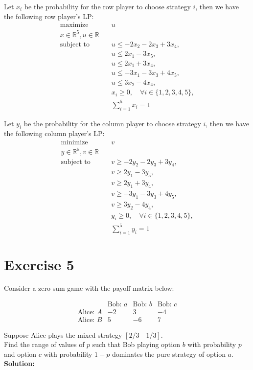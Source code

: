 \documentclass{article}
\begin{document}
Let $x_i$ be the probability for the row player to choose strategy $i$, then we have the following row player's LP:
\begin{align*}
\text{maximize} & \quad u \\
x \in \mathbb{R}^5, u \in \mathbb{R} & \\
\text{subject to} & \quad u \leq -2x_2 - 2x_3 + 3x_4, \\
& \quad u \leq 2x_1 - 3x_5, \\
& \quad u \leq 2x_1 + 3x_4, \\
& \quad u \leq -3x_1 - 3x_3 + 4x_5, \\
& \quad u \leq 3x_2 - 4x_4, \\
& \quad x_i \geq 0, \quad \forall i \in \{1,2,3,4,5\}, \\
& \quad \sum_{i=1}^5 x_i = 1
\end{align*}

Let $y_i$ be the probability for the column player to choose strategy $i$, then we have the following column player's LP:
\begin{align*}
\text{minimize} & \quad v \\
y \in \mathbb{R}^5, v \in \mathbb{R} & \\
\text{subject to} & \quad v \geq -2y_2 - 2y_3 + 3y_4, \\
& \quad v \geq 2y_1 - 3y_5, \\
& \quad v \geq 2y_1 + 3y_4, \\
& \quad v \geq -3y_1 - 3y_3 + 4y_5, \\
& \quad v \geq 3y_2 - 4y_4, \\
& \quad y_i \geq 0, \quad \forall i \in \{1,2,3,4,5\}, \\
& \quad \sum_{i=1}^5 y_i = 1
\end{align*}

\newpage

\section*{Exercise 5}
Consider a zero-sum game with the payoff matrix below:

$$\begin{array}{c|ccc}
& \text{Bob: } a & \text{Bob: } b & \text{Bob: } c \\
\hline
\text{Alice: } A & -2 & 3 & -4 \\
\text{Alice: } B & 5 & -6 & 7
\end{array}$$

Suppose Alice plays the mixed strategy $\left[2/3 \quad 1/3\right]$. \\

Find the range of values of $p$ such that Bob playing option $b$ with probability $p$ and option $c$ with probability $1 - p$ dominates the pure strategy of option $a$. \\

\textbf{Solution: } \\
\end{document}

